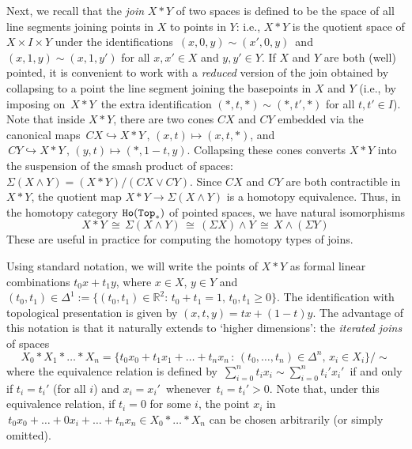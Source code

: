 \documentclass[11pt]{amsart}
\theoremstyle{definition}
\theoremstyle{remark}
\numberwithin{equation}{section}
\newcommand{\la}{\label}
\newcommand{\into}{\hookrightarrow}
\newcommand{\Top}{\mathtt{Top}}
\begin{document}
Next, we recall that the {\it join} $ X \ast Y $ of two spaces is defined to be the space of all line segments joining points in $X$ to points in $Y$: i.e., $ X \ast Y $ is the quotient space of $ X \times I \times Y $ under the identifications $\,(x, 0, y) \sim (x', 0, y)\,$ and $(x,1,y) \sim (x,1,y') $ for all $x, x' \in X $ and $y,y' \in Y $. If $X$ and $Y$ are both (well) pointed, it is convenient to work with a {\it reduced} version of the join obtained by collapsing to a point the line segment joining the basepoints in $X$ and $Y$ (i.e., by imposing on $\,X \ast Y\,$ the extra  identification $(\ast, t,\ast) \sim (\ast, t', \ast) $ for all $t,t' \in I $). Note that inside $ X \ast Y $, there are two cones $CX$ and $CY$ embedded via the canonical maps $\,CX \into X\ast Y\,,\, (x,t) \mapsto (x,t,\ast) $, and 
$\,CY \into X\ast Y\,,\, (y,t) \mapsto (\ast, 1-t, y) $. Collapsing these cones converts $ X \ast Y $ into the suspension of the smash product of spaces: $ \Sigma(X \wedge Y) = (X \ast Y)/(CX \vee CY ) $. Since $CX$ and $CY$ are both contractible in $X \ast Y $, the quotient map $ X \ast Y \to \Sigma(X \wedge Y)$ is a homotopy equivalence. Thus, in the homotopy category $ {\tt Ho}(\Top_*) $ of pointed spaces, we have natural isomorphisms
%
\begin{equation}
\la{joineq}
X \ast Y\,\cong\,\Sigma(X \wedge Y) \,\cong\,(\Sigma X) \wedge Y \,\cong\,X \wedge (\Sigma Y)
\end{equation}
%
These are useful in practice for computing the homotopy types of joins.

Using standard notation, we will write the points of $ X \ast Y $ as formal linear combinations
$ t_0 x + t_1 y $, where  $ x \in X$, $ y \in Y $ and $ (t_0, t_1) \in \Delta^1 :=
\{(t_0, t_1) \in {\mathbb R}^2:\, t_0 + t_1 = 1,\,t_0,t_1 \ge 0\} $. The identification with topological presentation is given by $ (x,t,y) = t x + (1-t) y $. 
The advantage of this notation is that it naturally extends to `higher dimensions': the {\it iterated joins} of spaces
%
\begin{equation}
\la{itjoin}
X_0 \ast X_1 \ast \ldots \ast X_n = \{t_0 x_0 + t_1 x_1 + \ldots + t_n x_n\,:\,
(t_0,\ldots, t_n) \in \Delta^n,\, x_i \in X_i\}/\!\sim    
\end{equation}
%
where the equivalence relation is defined by 
$\,\sum_{i=0}^n t_i x_i \sim \sum_{i=0}^{n} t_i' x_i' \,$ if and only if $ t_i = t_i' $ (for all $i$) and $ x_i = x_i' \,$ whenever $\, t_i = t_i' > 0 $. Note that, under this equivalence relation, if $ t_i = 0 $ for some $i$, the point $ x_i $ in $\, t_0 x_0 + \ldots + 0 x_i + \ldots + t_n x_n \in X_0 \ast \ldots \ast X_n $ can be chosen arbitrarily (or simply omitted). 
\end{document}
